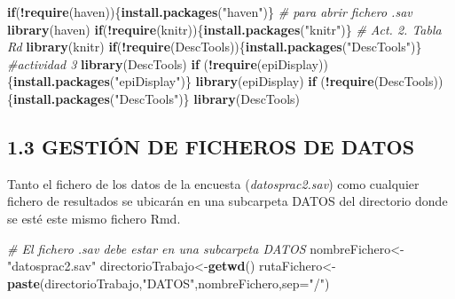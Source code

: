 \documentclass[
  12 pt,
  a4paper,
]{article}
\newenvironment{Shaded}{\begin{snugshade}}{\end{snugshade}}
\newcommand{\AttributeTok}[1]{\textcolor[rgb]{0.13,0.29,0.53}{#1}}
\newcommand{\CommentTok}[1]{\textcolor[rgb]{0.56,0.35,0.01}{\textit{#1}}}
\newcommand{\ControlFlowTok}[1]{\textcolor[rgb]{0.13,0.29,0.53}{\textbf{#1}}}
\newcommand{\FunctionTok}[1]{\textcolor[rgb]{0.13,0.29,0.53}{\textbf{#1}}}
\newcommand{\NormalTok}[1]{#1}
\newcommand{\OtherTok}[1]{\textcolor[rgb]{0.56,0.35,0.01}{#1}}
\newcommand{\SpecialCharTok}[1]{\textcolor[rgb]{0.81,0.36,0.00}{\textbf{#1}}}
\newcommand{\StringTok}[1]{\textcolor[rgb]{0.31,0.60,0.02}{#1}}
\begin{document}
\begin{Shaded}
\begin{Highlighting}[]
\ControlFlowTok{if}\NormalTok{(}\SpecialCharTok{!}\FunctionTok{require}\NormalTok{(haven))\{}\FunctionTok{install.packages}\NormalTok{(}\StringTok{"haven"}\NormalTok{)\} }\CommentTok{\# para abrir fichero .sav}
\FunctionTok{library}\NormalTok{(haven)}
\ControlFlowTok{if}\NormalTok{(}\SpecialCharTok{!}\FunctionTok{require}\NormalTok{(knitr))\{}\FunctionTok{install.packages}\NormalTok{(}\StringTok{"knitr"}\NormalTok{)\} }\CommentTok{\# Act. 2. Tabla Rd}
\FunctionTok{library}\NormalTok{(knitr)}
\ControlFlowTok{if}\NormalTok{(}\SpecialCharTok{!}\FunctionTok{require}\NormalTok{(DescTools))\{}\FunctionTok{install.packages}\NormalTok{(}\StringTok{"DescTools"}\NormalTok{)\} }\CommentTok{\#actividad 3}
\FunctionTok{library}\NormalTok{(DescTools)}
\ControlFlowTok{if}\NormalTok{ (}\SpecialCharTok{!}\FunctionTok{require}\NormalTok{(epiDisplay))\{}\FunctionTok{install.packages}\NormalTok{(}\StringTok{"epiDisplay"}\NormalTok{)\}}
\FunctionTok{library}\NormalTok{(epiDisplay)}
\ControlFlowTok{if}\NormalTok{ (}\SpecialCharTok{!}\FunctionTok{require}\NormalTok{(DescTools))\{}\FunctionTok{install.packages}\NormalTok{(}\StringTok{"DescTools"}\NormalTok{)\}}
\FunctionTok{library}\NormalTok{(DescTools)}
\end{Highlighting}
\end{Shaded}

\subsection{1.3 GESTIÓN DE FICHEROS DE
DATOS}\label{gestiuxf3n-de-ficheros-de-datos}

Tanto el fichero de los datos de la encuesta (\emph{datosprac2.sav})
como cualquier fichero de resultados se ubicarán en una subcarpeta DATOS
del directorio donde se esté este mismo fichero Rmd.

\begin{Shaded}
\begin{Highlighting}[]
\CommentTok{\# El fichero .sav debe estar en una subcarpeta DATOS}
\NormalTok{nombreFichero}\OtherTok{\textless{}{-}}\StringTok{"datosprac2.sav"}
\NormalTok{directorioTrabajo}\OtherTok{\textless{}{-}}\FunctionTok{getwd}\NormalTok{()}
\NormalTok{rutaFichero}\OtherTok{\textless{}{-}}\FunctionTok{paste}\NormalTok{(directorioTrabajo,}\StringTok{"DATOS"}\NormalTok{,nombreFichero,}\AttributeTok{sep=}\StringTok{"/"}\NormalTok{)}
\end{Highlighting}
\end{Shaded}
\end{document}
